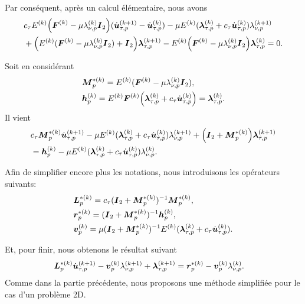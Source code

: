 \noindent Par conséquent, après un calcul élémentaire, nous avons
\begin{align*}
&c_\tau E^{(k)}\Big( \bF^{(k)}-\mu  \lambda_{\nu, p}^{(k)}\bI_2\Big)(\dot\bu_{\tau, p}^{(k+1)}-\dot\bu_{\tau, p}^{(k)}) - \mu E^{(k)} (\blambda_{\tau, p}^{(k)}+c_\tau \dot\bu_{\tau, p}^{(k)})\lambda_{\nu, p}^{(k+1)}\\
& +\Big( E^{(k)}(\bF^{(k)}- \mu\lambda_{\nu, p}^{(k)}\bI_2 )+\bI_2  \Big)\blambda_{\tau, p}^{(k+1)} -E^{(k)}\Big( \bF^{(k)} - \mu\lambda_{\nu, p}^{(k)}\bI_2  \Big)\blambda_{\tau, p}^{(k)}= 0\nonumber.
\end{align*}

\noindent Soit en considérant
\begin{align*}
&\Mb_p^{*(k)}=E^{(k)}(\bF^{(k)} - \mu  \lambda_{\nu, p}^{(k)}\bI_2),\\
&\bh_p^{(k)}=E^{(k)}\bF^{(k)} \Big(\blambda_{\tau, p}^{(k)}+ c_{\tau}\dot\bu_{\tau, p}^{(k)}\Big)=\blambda_{\tau, p}^{(k)}.
\end{align*}
Il vient
\begin{align*}
&c_\tau \Mb_p^{*(k)}\dot\bu_{\tau, p}^{(k+1)} - \mu E^{(k)} (\blambda_{\tau, p}^{(k)}+c_\tau \dot\bu_{\tau, p}^{(k)})\lambda_{\nu, p}^{(k+1)}+\Big(\bI_2+\Mb_p^{*(k)}  \Big)\blambda_{\tau, p}^{(k+1)}\\
& =\bh_p^{(k)} - \mu E^{(k)} (\blambda_{\tau, p}^{(k)}+c_\tau\dot\bu_{\tau, p}^{(k)})\lambda_{\nu, p}^{(k)} \nonumber.
\end{align*}

\noindent Afin de simplifier encore plus les notations, nous introduisons les opérateurs suivants:
\begin{align*}
&\bL_p^{*(k)}=c_{\tau}(\bI_2+ \Mb_p^{*(k)})^{-1}\Mb_p^{*(k)},\\
&\br_p^{*(k)}=(\bI_2+ \Mb_p^{*(k)})^{-1}\bh_p^{(k)},\\
&\bv_p^{(k)}=\mu(\bI_2+ \Mb_p^{*(k)})^{-1}E^{(k)} (\blambda_{\tau, p}^{(k)}+c_\tau\dot\bu_{\tau, p}^{(k)}).
\end{align*}

\noindent Et, pour finir, nous obtenons le résultat suivant
\begin{align*}
&\bL_p^{*(k)}\dot\bu_{\tau, p}^{(k+1)}- \bv_p^{(k)}\lambda_{\nu, p}^{(k+1)}+ \blambda_{\tau, p}^{(k+1)}= \br_p^{*(k)} - \bv_p^{(k)}\lambda_{\nu, p}^{(k)}.
\end{align*}
Comme dans la partie précédente, nous proposons une méthode simplifiée pour le cas d'un problème 2D.\\

